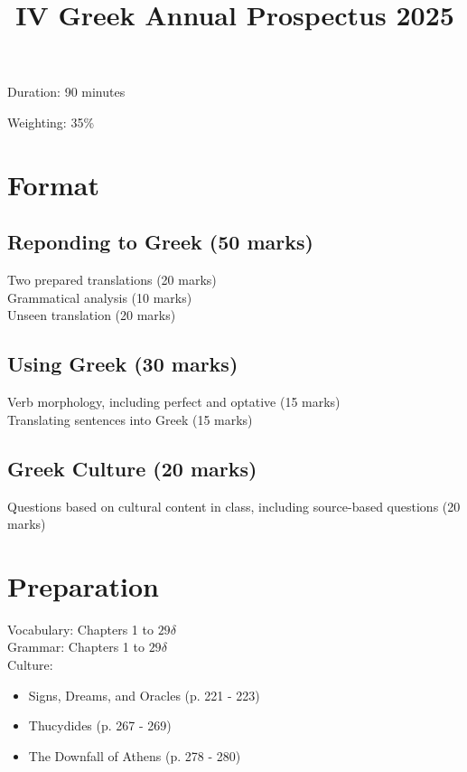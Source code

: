 \documentclass{article}
\title{IV Greek Annual Prospectus 2025}
\date{}
\author{}
\begin{document}
\maketitle
Duration: 90 minutes

Weighting: 35\%

\section{Format}

\subsection{Reponding to Greek (50 marks)}

Two prepared translations (20 marks) \\
Grammatical analysis (10 marks) \\
Unseen translation (20 marks)


\subsection{Using Greek (30 marks)}

Verb morphology, including perfect and optative (15 marks) \\
Translating sentences into Greek (15 marks)


\subsection{Greek Culture (20 marks)}

Questions based on cultural content in class, including source-based questions (20 marks)


\section{Preparation}

Vocabulary: Chapters 1 to \( 29\delta \) \\
Grammar: Chapters 1 to \( 29\delta \) \\
Culture:
\begin{itemize}
	\item Signs, Dreams, and Oracles (p. 221 - 223)
	\item Thucydides (p. 267 - 269)
	\item The Downfall of Athens (p. 278 - 280)
\end{itemize}
\end{document}
